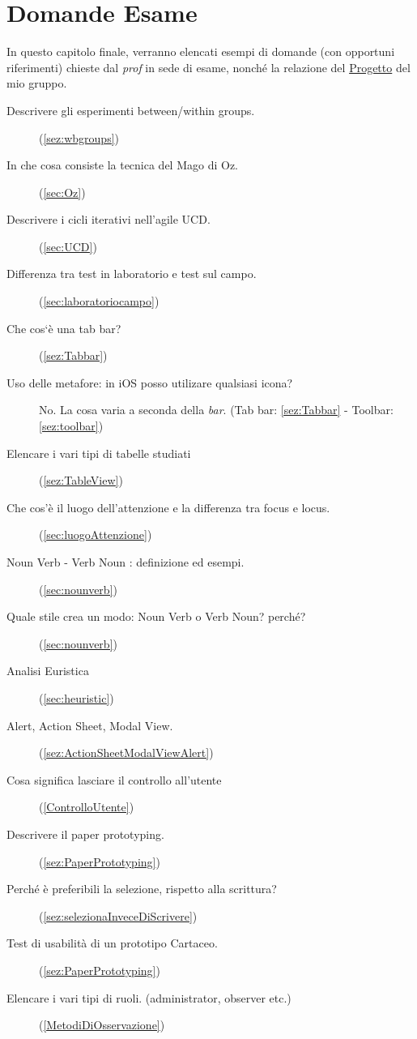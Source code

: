 \documentclass[oneside]{book}
\begin{document}
\chapter{Domande Esame}
	In questo capitolo finale, verranno elencati esempi di domande (con opportuni riferimenti) chieste dal \emph{prof} in sede di esame, nonché la relazione del \href{https://alexflyce.files.wordpress.com/2016/02/progetto.pdf}{Progetto} del mio gruppo.
	\begin{description}
	\item[Descrivere gli esperimenti between/within groups.] (\ref{sez:wbgroups})
	\item[In che cosa consiste la tecnica del Mago di Oz.] (\ref{sec:Oz})
	\item[Descrivere i cicli iterativi nell'agile UCD.] (\ref{sec:UCD})
	\item[Differenza tra test in laboratorio e test sul campo.] (\ref{sec:laboratoriocampo})
	\item[Che cos`è una tab bar?] (\ref{sez:Tabbar})
	\item[Uso delle metafore: in iOS posso utilizare qualsiasi icona?] No. La cosa varia a seconda della \emph{bar}.
	(Tab bar: \ref{sez:Tabbar} - Toolbar: \ref{sez:toolbar})
	\item[Elencare i vari tipi di tabelle studiati] (\ref{sez:TableView})
	\item[Che cos'è il luogo dell'attenzione e la differenza tra focus e locus.] (\ref{sec:luogoAttenzione})
	\item[Noun Verb - Verb Noun : definizione ed esempi.] (\ref{sec:nounverb})
	\item[Quale stile crea un modo: Noun Verb o Verb Noun? perché?] (\ref{sec:nounverb})
	\item[Analisi Euristica] (\ref{sec:heuristic})
	\item[Alert, Action Sheet, Modal View.] (\ref{sez:ActionSheetModalViewAlert})
	\item[Cosa significa lasciare il controllo all'utente] (\ref{ControlloUtente})
	\item[Descrivere il paper prototyping.] (\ref{sez:PaperPrototyping})
	\item[Perché è preferibili la selezione, rispetto alla scrittura?] (\ref{sez:selezionaInveceDiScrivere})
	\item[Test di usabilità di un prototipo Cartaceo.] (\ref{sez:PaperPrototyping})
	\item[Elencare i vari tipi di ruoli. (administrator, observer etc.)] (\ref{MetodiDiOsservazione})

\end{description}
\end{document}
